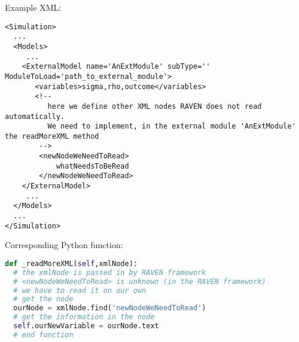 Example XML:
\begin{lstlisting}[style=XML,morekeywords={subType,ModuleToLoad}]
<Simulation>
  ...
  <Models>
     ...
    <ExternalModel name='AnExtModule' subType='' ModuleToLoad='path_to_external_module'>
       <variables>sigma,rho,outcome</variables>
       <!--
          here we define other XML nodes RAVEN does not read automatically.
          We need to implement, in the external module 'AnExtModule' the readMoreXML method
        -->
        <newNodeWeNeedToRead>
            whatNeedsToBeRead
        </newNodeWeNeedToRead>
    </ExternalModel>
     ...
  </Models>
  ...
</Simulation>
\end{lstlisting}

Corresponding Python function:
\begin{lstlisting}[language=python]
def _readMoreXML(self,xmlNode):
  # the xmlNode is passed in by RAVEN framework
  # <newNodeWeNeedToRead> is unknown (in the RAVEN framework)
  # we have to read it on our own
  # get the node
  ourNode = xmlNode.find('newNodeWeNeedToRead')
  # get the information in the node
  self.ourNewVariable = ourNode.text
  # end function
\end{lstlisting}


